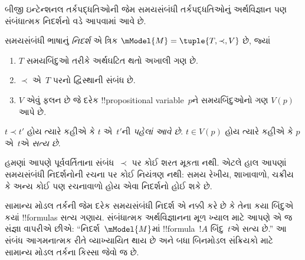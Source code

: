 \documentclass[../../../include/open-logic-section]{subfiles}
\begin{document}
બીજી ઇન્ટેન્શનલ તર્કપદ્ધતિઓની જેમ સમયસંબંધી તર્કપદ્ધતિઓનું
અર્થવિજ્ઞાન પણ સંબંધાત્મક નિદર્શનો વડે આપવામાં આવે છે.

\begin{defn}
  સમયસંબંધી ભાષાનું \emph{નિદર્શ} એ ત્રિક
  $\mModel{M} = \tuple{T, \prec, V}$ છે, જ્યાં
  \begin{enumerate}
  \item $T$ સમયબિંદુઓ તરીકે અર્થઘટિત થતો અખાલી ગણ છે.
  \item $\prec$ એ~$T$ પરનો દ્વિસ્થાની સંબંધ છે.
  \item $V$ એવું ફલન છે જે દરેક !!{propositional
    variable}~$p$ને સમયબિંદુઓનો ગણ $V(p)$ આપે છે.
  \end{enumerate}
  $t \prec t'$ હોય ત્યારે કહીએ કે $t$ એ~$t'$ની \emph{પહેલાં આવે છે}.
  $t \in V(p)$ હોય ત્યારે કહીએ કે $p$ એ~$t$એ \emph{સત્ય છે}.
\end{defn}

હમણાં આપણે પૂર્વવર્તિતાના સંબંધ~$\prec$ પર કોઈ શરત મૂકતા નથી.
એટલે હાલ આપણાં સમયસંબંધી નિદર્શનોની રચના પર કોઈ નિયંત્રણ નથી:
સમય રેખીય, શાખાવાળો, ચક્રીય કે અન્ય કોઈ પણ રચનાવાળો હોય એવા
નિદર્શનો હોઈ શકે છે.

સામાન્ય મોડલ તર્કની જેમ દરેક સમયસંબંધી નિદર્શ એ નક્કી કરે છે કે
તેના કયા બિંદુએ કયાં !!{formula}s સત્ય ગણાય. સંબંધાત્મક
અર્થવિજ્ઞાનના મૂળ ખ્યાલ માટે આપણે એ જ સંજ્ઞા વાપરીએ છીએ:
``નિદર્શ~$\mModel{M}$માં !!{formula}~$!A$ બિંદુ~$t$એ સત્ય છે.''
આ સંબંધ આગમનાત્મક રીતે વ્યાખ્યાયિત થાય છે અને બધા બિનમોડલ
સંક્રિયકો માટે સામાન્ય મોડલ તર્કના કિસ્સા જેવો જ છે.
\end{document}
